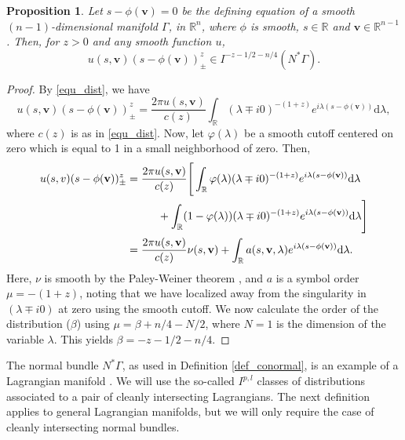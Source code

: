\documentclass[a4paper,12pt]{amsart}
\numberwithin{equation}{section}
\theoremstyle{plain}
\numberwithin{theorem}{section}
\newtheorem{proposition}[theorem]{Proposition}
\theoremstyle{definition}
\theoremstyle{remark}
\theoremstyle{remark}
\theoremstyle{remark}
\newcommand{\vv}{{\mathbf{v}}}
\begin{document}
\begin{proposition}
\label{prop_sqrt}
Let $s - \phi(\vv) = 0$ be the defining equation of a smooth $(n-1)$-dimensional manifold $\Gamma$, in $\mathbb{R}^n$, where $\phi$ is smooth, $s\in \mathbb{R}$ and $\vv \in \mathbb{R}^{n-1}$. Then, for $z >0$ and any smooth function $u$,
\begin{equation}
\label{dist_order_0}
u(s,\vv)(s - \phi(\vv))^{z}_\pm \in I^{-z-1/2-n/4}(N^*\Gamma).
\end{equation}
\end{proposition}
\begin{proof}
By \eqref{equ_dist}, we have
\begin{equation}
u(s,\vv)(s - \phi(\vv))^{z}_\pm = \frac{2\pi u(s,\vv)}{c(z)}\int_{\mathbb{R}}(\lambda \mp i0)^{-(1+z)} e^{i \lambda (s- \phi(\vv))} \mathrm{d}\lambda,
\end{equation}
where $c(z)$ is as in \eqref{equ_dist}. Now, let $\varphi(\lambda)$ be a smooth cutoff centered on zero which is equal to 1 in a small neighborhood of zero. Then, 
\begin{equation}
\begin{split}
u(s,v)(s - \phi(\vv))^{z}_\pm &= \frac{2\pi u(s,\vv)}{c(z)}\Bigg [ \int_{\mathbb{R}}\varphi(\lambda)(\lambda \mp i0)^{-(1+z)} e^{i \lambda (s- \phi(\vv))} \mathrm{d}\lambda\\
& \hskip1cm + \int_{\mathbb{R}}(1- \varphi(\lambda)) (\lambda \mp i0)^{-(1+z)} e^{i \lambda (s- \phi(\vv))} \mathrm{d}\lambda \Bigg]\\
&= \frac{2\pi u(s,\vv)}{c(z)} \nu(s,\vv) + \int_{\mathbb{R}}a(s,\vv,\lambda) e^{i \lambda (s- \phi(\vv))} \mathrm{d}\lambda.
\end{split}
\end{equation}
Here, $\nu$ is smooth by the Paley-Weiner theorem \cite[Theorem 7.3.1]{hormanderI}, and $a$ is a symbol order $\mu = -(1+z)$, noting that we have localized away from the singularity in $(\lambda \mp i0)$ at zero using the smooth cutoff. We now calculate the order of the distribution ($\beta$) using $\mu = \beta + n/4 - N/2$, where $N = 1$ is the dimension of the variable $\lambda$. This yields $\beta = -z-1/2-n/4$.
\end{proof}

The normal bundle $N^* \Gamma$, as used in Definition \ref{def_conormal}, is an example of a Lagrangian manifold \cite[Chapter XXI]{hormanderIII}. We will use the so-called $I^{p,l}$ classes of distributions associated to a pair of cleanly intersecting Lagrangians. The next definition applies to general Lagrangian manifolds, but we will only require the case of cleanly intersecting normal bundles.
\end{document}
